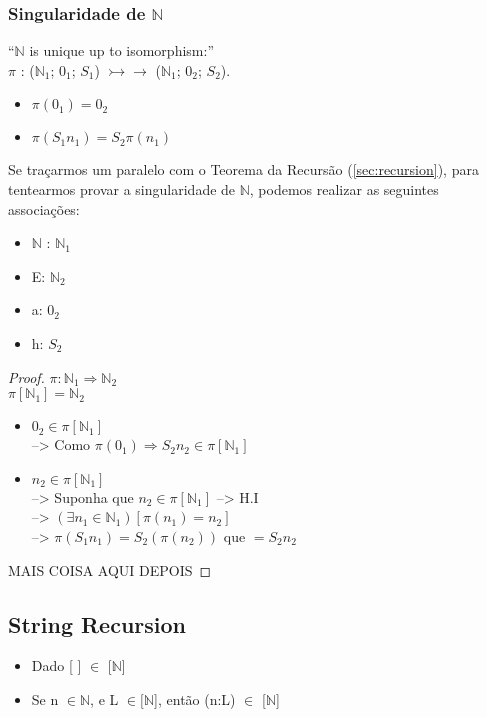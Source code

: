 \documentclass[12pt, a4paper]{article}
\begin{document}
			\subsubsection{Singularidade de $\mathbb{N}$}
				``$\mathbb{N}$ is unique up to isomorphism:''\\
				$\pi$ : ($\mathbb{N}_1$; $0_1$; $S_1$) $ \rightarrowtail\!\!\!\!\!\rightarrow $ ($\mathbb{N}_1$; $0_2$; $S_2$).
				\begin{itemize}
				\item[]\hspace{4bp}$\pi (0_1) = 0_2$
				\item[]\hspace{4bp}$\pi (S_1 n_1) = S_2 \pi (n_1)$
				\end{itemize}

				Se tra\c{c}armos um paralelo com o Teorema da Recurs\~ao (\ref{sec:recursion}), para tentearmos provar a singularidade de $\mathbb{N}$, podemos realizar as seguintes associa\c{c}\~oes:
				\begin{itemize}
				\item $\mathbb{N}$ : $\mathbb{N}_1$
				\item E: $\mathbb{N}_2$
				\item a: $0_2$
				\item h: $S_2$
				\end{itemize}

				\begin{proof}
					$\pi : \mathbb{N}_1 \Rightarrow \mathbb{N}_2$\\
					$\pi[\mathbb{N}_1] = \mathbb{N}_2$
						\begin{itemize}
						\item $0_2 \in \pi[\mathbb{N}_1]$\\
						--> Como $\pi(0_1) \Rightarrow S_2n_2 \in \pi[\mathbb{N}_1]$
						\item $n_2 \in \pi[\mathbb{N}_1]$\\
						--> Suponha que $n_2 \in \pi[\mathbb{N}_1]$ --> H.I\\
						--> $(\exists n_1 \in \mathbb{N}_1)[\pi(n_1) = n_2]$\\
						--> $\pi(S_1n_1) = S_2(\pi(n_2))$ que $ = S_2n_2$\\
						\end{itemize}
				
						MAIS COISA AQUI DEPOIS

				\end{proof}

		\subsection{String Recursion}
			\begin{itemize}
			\item Dado [ ] $\in$ [$\mathbb{N}$]
			\item Se n $\in \mathbb{N}$, e L $\in [\mathbb{N}$], ent\~ao (n:L) $\in$ [$\mathbb{N}$]
			\end{itemize}
\end{document}
